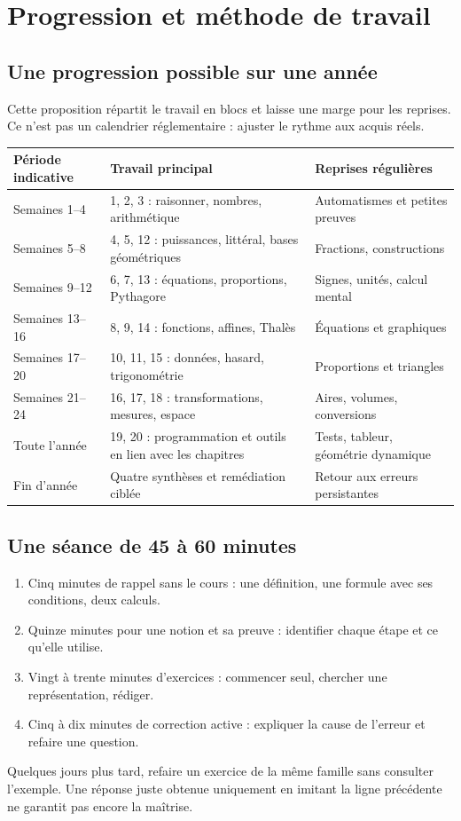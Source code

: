 \documentclass[11pt,a4paper,oneside]{book}
\begin{document}
\chapter{Progression et méthode de travail}
\section{Une progression possible sur une année}
Cette proposition répartit le travail en blocs et laisse une marge pour les reprises. Ce n'est pas un calendrier réglementaire : ajuster le rythme aux acquis réels.
\begin{center}
\small
\begin{tabularx}{\textwidth}{lXX}
\toprule Période indicative & Travail principal & Reprises régulières\\\midrule
Semaines 1--4 & 1, 2, 3 : raisonner, nombres, arithmétique & Automatismes et petites preuves\\
Semaines 5--8 & 4, 5, 12 : puissances, littéral, bases géométriques & Fractions, constructions\\
Semaines 9--12 & 6, 7, 13 : équations, proportions, Pythagore & Signes, unités, calcul mental\\
Semaines 13--16 & 8, 9, 14 : fonctions, affines, Thalès & Équations et graphiques\\
Semaines 17--20 & 10, 11, 15 : données, hasard, trigonométrie & Proportions et triangles\\
Semaines 21--24 & 16, 17, 18 : transformations, mesures, espace & Aires, volumes, conversions\\
Toute l'année & 19, 20 : programmation et outils en lien avec les chapitres & Tests, tableur, géométrie dynamique\\
Fin d'année & Quatre synthèses et remédiation ciblée & Retour aux erreurs persistantes\\\bottomrule
\end{tabularx}
\end{center}
\section{Une séance de 45 à 60 minutes}
\begin{enumerate}
\item Cinq minutes de rappel sans le cours : une définition, une formule avec ses conditions, deux calculs.
\item Quinze minutes pour une notion et sa preuve : identifier chaque étape et ce qu'elle utilise.
\item Vingt à trente minutes d'exercices : commencer seul, chercher une représentation, rédiger.
\item Cinq à dix minutes de correction active : expliquer la cause de l'erreur et refaire une question.
\end{enumerate}
Quelques jours plus tard, refaire un exercice de la même famille sans consulter l'exemple. Une réponse juste obtenue uniquement en imitant la ligne précédente ne garantit pas encore la maîtrise.
\end{document}
